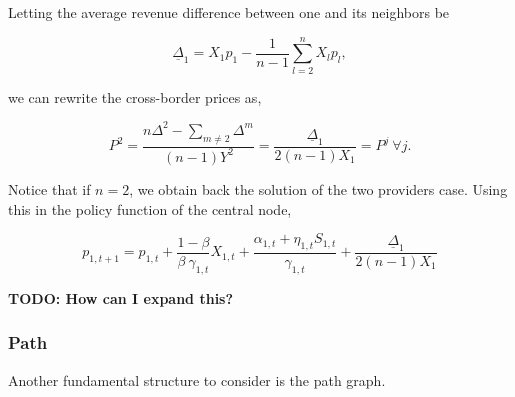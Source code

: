 Letting the average revenue difference between one and its neighbors be

\begin{equation*}
    \underline{\Delta}_1 = X_1 p_1 - \frac{1}{n-1} \sum^n_{l = 2} X_l p_l,
\end{equation*}

we can rewrite the cross-border prices as,

\begin{equation*}
    P^2 = \frac{n \Delta^2 - \sum_{m \neq 2} \Delta^m}{(n-1) Y^2} = \frac{\underline{\Delta}_1}{2 (n-1) X_1} = P^j \ \forall j.
\end{equation*}

Notice that if $n = 2$, we obtain back the solution of the two providers case. Using this in the policy function of the central node,


\begin{equation*}
    p_{1, t+1} = p_{1, t} + \frac{1-\beta}{\beta \ \gamma_{1, t}} X_{1, t} + \frac{\alpha_{1, t} + \eta_{1, t} S_{1, t}}{\gamma_{1, t}} + \frac{\underline{\Delta}_1}{2 (n-1) X_1}
\end{equation*}

\textbf{TODO: How can I expand this?}

\subsubsection{Path}

Another fundamental structure to consider is the path graph.


